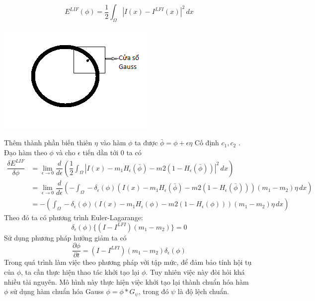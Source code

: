 \documentclass[12pt,oneside,a4]{report}
\begin{document}
\begin{equation}
E^{LIF}(\phi)=\dfrac{1}{2}\int_{\Omega}|I(x)-I^{LFI}(x)|^2\,dx
\end{equation}
\begin{center}
\includegraphics[]{figure/Gaussfilter.png}
\end{center}
Thêm thành phần biến thiên $\eta$ vào hàm $\phi$ ta được $\bar{\phi}=\phi+\epsilon \eta$
Cố định $c_1, c_2$ . Đạo hàm theo $\phi$ và cho $\epsilon$ tiến dần tới 0 ta có
\begin{equation}
\begin{split}
\dfrac{\delta E^{LIF}}{\delta \phi } &=\lim_{\epsilon \rightarrow 0}\dfrac{d}{d \epsilon}(\dfrac{1}{2}\int_{\Omega}|I(x)-m_1H_{\epsilon}(\bar{\phi})-m2(1-H_{\epsilon}(\bar{\phi}))|^2\,dx) \\ 
&=\lim_{\epsilon \rightarrow 0}\dfrac{d}{d \epsilon}(-\int_{\Omega}-\delta_{\epsilon}(\phi)(I(x)-m_1H_{\epsilon}(\bar{\phi})-m2(1-H_{\epsilon}(\bar{\phi})))(m_1-m_2)\eta\,dx) \\ 
&=-(\int_{\Omega}-\delta_{\epsilon}(\phi)(I(x)-m_1 H_{\epsilon}(\phi)-m2(1-H_{\epsilon}(\phi)))(m_1-m_2)\eta\,dx)
\end{split}
\end{equation}
Theo đó ta có phương trình Euler-Lagarange:
\begin{equation}
\delta_{\epsilon}(\phi)\{(I-I^{LFI})(m_1-m_2)\}=0
\end{equation}
Sử dụng phương pháp hướng giảm ta có
\begin{equation}
\dfrac{\partial \phi}{\partial t}=(I-I^{LFI})(m_1-m_2)\delta_{\epsilon}(\phi)
\end{equation}
Trong quá trình làm việc theo phương pháp với tập mức, để đảm bảo tính hội tụ của $\phi$, ta cần thực hiện thao tác khởi tạo lại $\phi$. Tuy nhiên việc này đòi hỏi khá nhiều tài nguyên. Mô hình này thực hiện việc khởi tạo lại thành chuẩn hóa hàm $\phi$ sử dụng hàm chuẩn hóa Gauss $\phi=\phi* G_{\psi}$, trong đó $\psi$ là độ lệch chuẩn.
\end{document}
